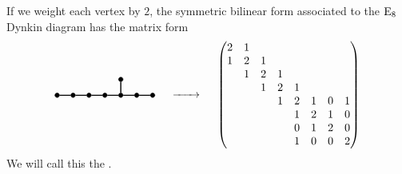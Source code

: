 \begin{example}
	If we weight each vertex by $2$, the symmetric bilinear form associated to the $\mathrm{E}_8$ Dynkin diagram has the matrix form
	\[
		\begin{tikzpicture}
			\tikzset{dynode/.style={circle, draw, fill=black,
						minimum size=4pt, inner sep=0pt}}
			\tikzset{dyline/.style={line width=1pt}}
			\tikzset{dydash/.style={line width=1pt, dashed}}

			\begin{scope}[yshift=-10em, xshift=0]
				\node[dynode] (a1) at (0,0) {};
				\node[dynode] (a2) at (0.5,0) {};
				\node[dynode] (a3) at (1,0) {};
				\node[dynode] (a4) at (1.5,0) {};
				\node[dynode] (a5) at (2,0) {};
				\node[dynode] (a6) at (2.5,0) {};
				\node[dynode] (a7) at (3,0) {};
				\node[dynode] (a8) at (2,0.5) {};

				\draw[dyline] (a1) -- (a2) -- (a3) -- (a4) -- (a5) -- (a6) -- (a7);
				\draw[dyline] (a5) -- (a8);
			\end{scope}
		\end{tikzpicture}
		\quad\lkxto\quad
		\begin{pmatrix}
			2 & 1 &   &   &   &   &   &   \\
			1 & 2 & 1 &   &   &   &   &   \\
			  & 1 & 2 & 1 &   &   &   &   \\
			  &   & 1 & 2 & 1 &   &   &   \\
			  &   &   & 1 & 2 & 1 & 0 & 1 \\
			  &   &   &   & 1 & 2 & 1 & 0 \\
			  &   &   &   & 0 & 1 & 2 & 0 \\
			  &   &   &   & 1 & 0 & 0 & 2 \\
		\end{pmatrix}
	\]
	We will call this the .
\end{example}

